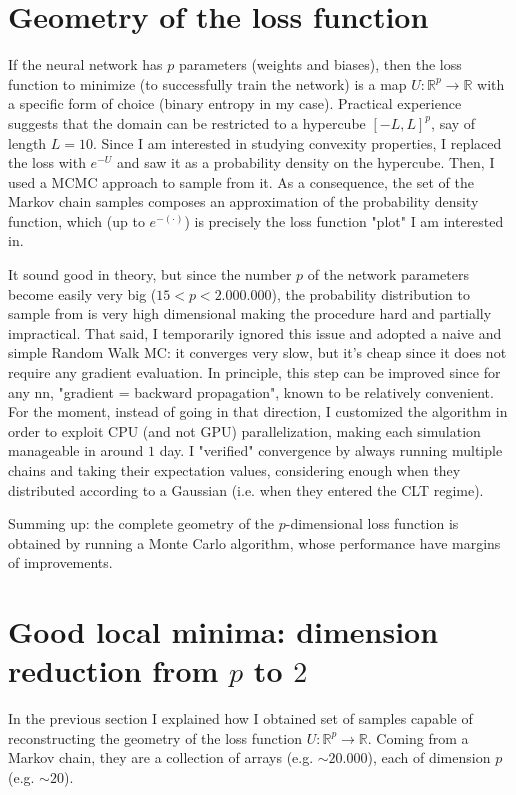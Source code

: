 \documentclass{article}
\begin{document}
\section{Geometry of the loss function}
If the neural network has $p$ parameters (weights and biases), then
the loss function to minimize (to successfully train the network)
is a map $U : \mathbb{R}^p \to \mathbb{R}$ with a specific form of
choice (binary entropy in my case).
Practical experience suggests that the domain can be restricted to 
a hypercube $[-L, L]^p$, say of length $L = 10$. Since I am interested
in studying convexity properties, I replaced the loss with $e^{-U}$ and
saw it as a probability density on the hypercube. Then, I used a MCMC
approach to sample from it. As a consequence, 
the set of the Markov chain samples composes an approximation
of the probability density function, 
which (up to $e^{-(\cdot)}$) is precisely the loss function "plot"
I am interested in.


It sound good in theory, but since the number $p$ of the
network parameters become easily very big ($15 < p < 2.000.000$), 
the probability distribution 
to sample from is very high dimensional making the
procedure hard and partially impractical.
That said, I temporarily ignored this issue and
adopted a naive and simple Random Walk MC: it converges very slow, but it's
cheap since it does not require any gradient evaluation. In principle,
this step can be improved since for any nn, "gradient = backward propagation",
known to be relatively convenient. For the moment, instead of going in that
direction, I customized the algorithm in order to exploit CPU (and not GPU)
parallelization, making each simulation manageable in around $1$ day.
I "verified" convergence by always running multiple chains and taking their
expectation values, considering enough when they distributed
according to a Gaussian (i.e. when they entered the CLT regime).


Summing up: the complete geometry of the $p$-dimensional
loss function is obtained by running
a Monte Carlo algorithm, whose performance have margins of improvements.


\section{Good local minima: dimension reduction from $p$ to $2$}
In the previous section I explained how I obtained
set of samples capable of reconstructing the geometry of
the loss function $U : \mathbb{R}^p \to \mathbb{R}$.
Coming from a Markov chain, they are a collection of arrays
(e.g. $\sim 20.000$), each of dimension $p$ (e.g. $\sim 20$).
\end{document}
